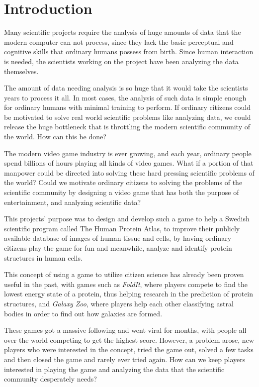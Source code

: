 \iffalse
\section{Introduction}\label{sec:introduction}

Many scientific projects require the analysis of huge amounts of data that the modern computer can not process, since they lack the basic perceptual and cognitive skills that ordinary humans possess from birth. Since human interaction is needed, the scientists working on the project have been analyzing the data themselves. 

The amount of data needing analysis is so huge that it would take the scientists years to process it all. In most cases, the analysis of such data is simple enough for ordinary humans with minimal training to perform. If ordinary citizens could be motivated to solve real world scientific problems like analyzing data, we could release the huge bottleneck that is throttling the modern scientific community of the world. How can this be done?

The modern video game industry is ever growing, and each year, ordinary people spend billions of hours playing all kinds of video games. What if a portion of that manpower could be directed into solving these hard pressing scientific problems of the world? Could we motivate ordinary citizens to solving the problems of the scientific community by designing a video game that has both the purpose of entertainment, and analyzing scientific data?

This projects' purpose was to design and develop such a game to help a Swedish scientific program called The Human Protein Atlas, to improve their publicly available database of images of human tissue and cells, by having ordinary citizens play the game for fun and meanwhile, analyze and identify protein structures in human cells.

This concept of using a game to utilize citizen science has already been proven useful in the past, with games such as \emph{FoldIt}, where players compete to find the lowest energy state of a protein, thus helping research in the prediction of protein structures, and \emph{Galaxy Zoo}, where players help each other classifying astral bodies in order to find out how galaxies are formed.

These games got a massive following and went viral for months, with people all over the world competing to get the highest score. However, a problem arose, new players who were interested in the concept, tried the game out, solved a few tasks and then closed the game and rarely ever tried again. How can we keep players interested in playing the game and analyzing the data that the scientific community desperately needs?

